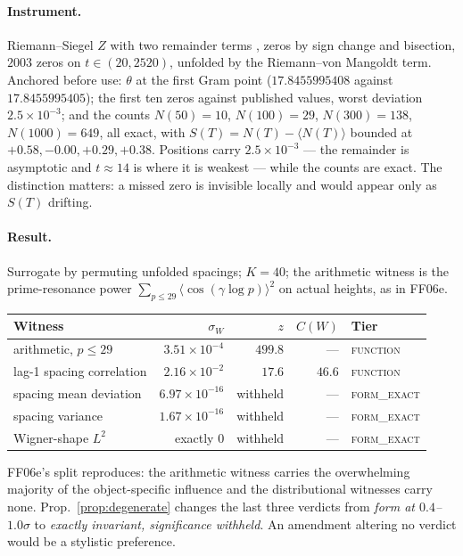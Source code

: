 \documentclass[11pt]{article}
\theoremstyle{remark}
\newcommand{\tier}[1]{\textsc{#1}}
\begin{document}
\paragraph{Instrument.} Riemann--Siegel $Z$ with two remainder terms \cite{edwards}, zeros
by sign change and bisection, $2003$ zeros on $t\in(20,2520)$, unfolded by the
Riemann--von Mangoldt term. Anchored before use: $\theta$ at the first Gram point
($17.8455995408$ against $17.8455995405$); the first ten zeros against published values,
worst deviation $2.5\times10^{-3}$; and the counts $N(50)=10$, $N(100)=29$, $N(300)=138$,
$N(1000)=649$, all exact, with $S(T)=N(T)-\langle N(T)\rangle$ bounded at
$+0.58,-0.00,+0.29,+0.38$. Positions carry $2.5\times10^{-3}$ --- the remainder is
asymptotic and $t\approx14$ is where it is weakest --- while the counts are exact. The
distinction matters: a missed zero is invisible locally and would appear only as $S(T)$
drifting.

\paragraph{Result.} Surrogate by permuting unfolded spacings; $K=40$; the arithmetic
witness is the prime-resonance power $\sum_{p\le29}\langle\cos(\gamma\log p)\rangle^2$ on
actual heights, as in FF06e.

\begin{center}\small
\begin{tabular}{lrrrl}
\toprule
Witness & $\sigma_W$ & $z$ & $C(W)$ & Tier \\
\midrule
arithmetic, $p\le29$      & $3.51\times10^{-4}$ & $\mathbf{499.8}$ & --- & \tier{function} \\
lag-1 spacing correlation & $2.16\times10^{-2}$ & $\mathbf{17.6}$ & $46.6$ & \tier{function} \\
spacing mean deviation    & $6.97\times10^{-16}$ & withheld & --- & \tier{form\_exact} \\
spacing variance          & $1.67\times10^{-16}$ & withheld & --- & \tier{form\_exact} \\
Wigner-shape $L^2$        & exactly $0$ & withheld & --- & \tier{form\_exact} \\
\bottomrule
\end{tabular}
\end{center}

FF06e's split reproduces: the arithmetic witness carries the overwhelming majority of the
object-specific influence and the distributional witnesses carry none.
Prop.~\ref{prop:degenerate} changes the last three verdicts from \emph{form at
$0.4$--$1.0\sigma$} to \emph{exactly invariant, significance withheld}. An amendment
altering no verdict would be a stylistic preference.
\end{document}
